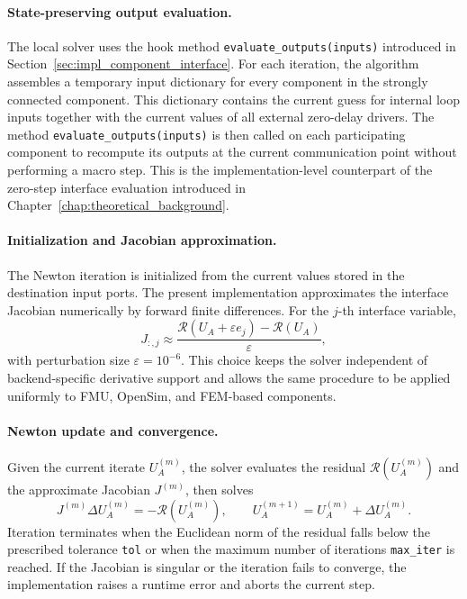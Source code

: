 \paragraph{State-preserving output evaluation.}
The local solver uses the hook method \texttt{evaluate\_outputs(inputs)} introduced in Section~\ref{sec:impl_component_interface}.
For each iteration, the algorithm assembles a temporary input dictionary for every component in the strongly connected component.
This dictionary contains the current guess for internal loop inputs together with the current values of all external zero-delay drivers.
The method \texttt{evaluate\_outputs(inputs)} is then called on each participating component to recompute its outputs at the current communication point without performing a macro step.
This is the implementation-level counterpart of the zero-step interface evaluation introduced in Chapter~\ref{chap:theoretical_background}.

\paragraph{Initialization and Jacobian approximation.}
The Newton iteration is initialized from the current values stored in the destination input ports.
The present implementation approximates the interface Jacobian numerically by forward finite differences.
For the $j$-th interface variable,
\begin{equation}
    J_{:,j} \approx \frac{\mathcal{R}(U_A + \varepsilon e_j) - \mathcal{R}(U_A)}{\varepsilon},
\end{equation}
with perturbation size $\varepsilon = 10^{-6}$.
This choice keeps the solver independent of backend-specific derivative support and allows the same procedure to be applied uniformly to FMU, OpenSim, and FEM-based components.

\paragraph{Newton update and convergence.}
Given the current iterate $U_A^{(m)}$, the solver evaluates the residual $\mathcal{R}(U_A^{(m)})$ and the approximate Jacobian $J^{(m)}$, then solves
\begin{equation}
    J^{(m)} \Delta U_A^{(m)} = -\mathcal{R}(U_A^{(m)}),
    \qquad
    U_A^{(m+1)} = U_A^{(m)} + \Delta U_A^{(m)}.
\end{equation}
Iteration terminates when the Euclidean norm of the residual falls below the prescribed tolerance \texttt{tol} or when the maximum number of iterations \texttt{max\_iter} is reached.
If the Jacobian is singular or the iteration fails to converge, the implementation raises a runtime error and aborts the current step.

